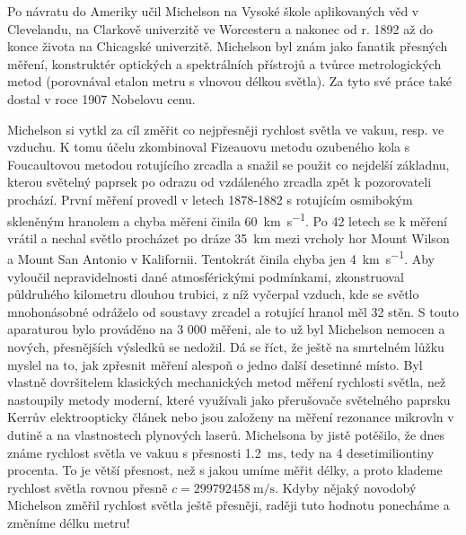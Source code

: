       Po návratu do Ameriky učil Michelson na Vysoké škole aplikovaných věd v Clevelandu, na
      Clarkově univerzitě ve Worcesteru a nakonec od r. 1892 až do konce života na Chicagské
      univerzitě. Michelson byl znám jako fanatik přesných měření, konstruktér optických a
      spektrálních přístrojů a tvůrce metrologických metod (porovnával etalon metru s vlnovou délkou
      světla). Za tyto své práce také dostal v roce 1907 Nobelovu cenu.

      \begin{tcnote}
        Michelson si vytkl za cíl změřit co nejpřesněji rychlost světla ve vakuu, resp. ve vzduchu.
        K tomu účelu zkombinoval Fizeauovu metodu ozubeného kola s Foucaultovou metodou rotujícího
        zrcadla a snažil se použit co nejdelší základnu, kterou světelný paprsek po odrazu od
        vzdáleného zrcadla zpět k pozorovateli prochází. První měření provedl v letech 1878-1882 s
        rotujícím osmibokým skleněným hranolem a chyba měřeni činila \SI{60}{\km\per\s}. Po 42
        letech se k měření vrátil a nechal světlo procházet po dráze \SI{35}{\km} mezi vrcholy hor
        Mount Wilson a Mount San Antonio v Kalifornii. Tentokrát činila chyba jen \SI{4}{\km\per\s}.
        Aby vyloučil nepravidelnosti dané atmosférickými podmínkami, zkonstruoval půldruhého
        kilometru dlouhou trubici, z níž vyčerpal vzduch, kde se světlo mnohonásobné odráželo od
        soustavy zrcadel a rotující hranol měl 32 stěn. S touto aparaturou bylo prováděno na 3 000
        měřeni, ale to už byl Michelson nemocen a nových, přesnějších výsledků se nedožil. Dá se
        říct, že ještě na smrtelném lůžku myslel na to, jak zpřesnit měření alespoň o jedno další
        desetinné místo. Byl vlastně dovršitelem klasických mechanických metod měření rychlosti
        světla, než nastoupily metody moderní, které využívali jako přerušovače světelného paprsku
        Kerrův elektroopticky článek nebo jsou založeny na měření rezonance mikrovln v dutině a na
        vlastnostech plynových laserů. Michelsona by jistě potěšilo, že dnes známe rychlost světla
        ve vakuu s přesnosti \SI{1.2}{\ms}, tedy na \num{4} desetimiliontiny procenta. To je větší
        přesnost, než s jakou umíme měřit délky, a proto klademe rychlost světla rovnou přesně \(c =
        \SI{299792458}{\m\per\s}\). Kdyby nějaký novodobý Michelson změřil rychlost světla ještě
        přesněji, raději tuto hodnotu ponecháme a změníme délku metru!
      \end{tcnote}


